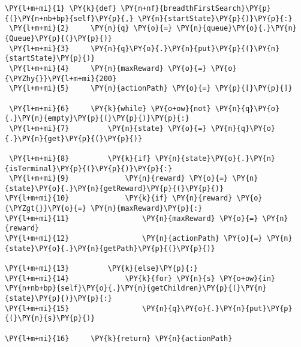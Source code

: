 \begin{Verbatim}[commandchars=\\\{\}]
 \PY{l+m+mi}{1} \PY{k}{def} \PY{n+nf}{breadthFirstSearch}\PY{p}{(}\PY{n+nb+bp}{self}\PY{p}{,} \PY{n}{startState}\PY{p}{)}\PY{p}{:}
 \PY{l+m+mi}{2}     \PY{n}{q} \PY{o}{=} \PY{n}{queue}\PY{o}{.}\PY{n}{Queue}\PY{p}{(}\PY{p}{)}
 \PY{l+m+mi}{3}     \PY{n}{q}\PY{o}{.}\PY{n}{put}\PY{p}{(}\PY{n}{startState}\PY{p}{)}
 \PY{l+m+mi}{4}     \PY{n}{maxReward} \PY{o}{=} \PY{o}{\PYZhy{}}\PY{l+m+mi}{200}
 \PY{l+m+mi}{5}     \PY{n}{actionPath} \PY{o}{=} \PY{p}{[}\PY{p}{]}

 \PY{l+m+mi}{6}     \PY{k}{while} \PY{o+ow}{not} \PY{n}{q}\PY{o}{.}\PY{n}{empty}\PY{p}{(}\PY{p}{)}\PY{p}{:}
 \PY{l+m+mi}{7}         \PY{n}{state} \PY{o}{=} \PY{n}{q}\PY{o}{.}\PY{n}{get}\PY{p}{(}\PY{p}{)}

 \PY{l+m+mi}{8}         \PY{k}{if} \PY{n}{state}\PY{o}{.}\PY{n}{isTerminal}\PY{p}{(}\PY{p}{)}\PY{p}{:}
 \PY{l+m+mi}{9}             \PY{n}{reward} \PY{o}{=} \PY{n}{state}\PY{o}{.}\PY{n}{getReward}\PY{p}{(}\PY{p}{)}
\PY{l+m+mi}{10}             \PY{k}{if} \PY{n}{reward} \PY{o}{\PYZgt{}}\PY{o}{=} \PY{n}{maxReward}\PY{p}{:}
\PY{l+m+mi}{11}                 \PY{n}{maxReward} \PY{o}{=} \PY{n}{reward}
\PY{l+m+mi}{12}                 \PY{n}{actionPath} \PY{o}{=} \PY{n}{state}\PY{o}{.}\PY{n}{getPath}\PY{p}{(}\PY{p}{)}

\PY{l+m+mi}{13}         \PY{k}{else}\PY{p}{:}
\PY{l+m+mi}{14}             \PY{k}{for} \PY{n}{s} \PY{o+ow}{in} \PY{n+nb+bp}{self}\PY{o}{.}\PY{n}{getChildren}\PY{p}{(}\PY{n}{state}\PY{p}{)}\PY{p}{:}
\PY{l+m+mi}{15}                 \PY{n}{q}\PY{o}{.}\PY{n}{put}\PY{p}{(}\PY{n}{s}\PY{p}{)}

\PY{l+m+mi}{16}     \PY{k}{return} \PY{n}{actionPath}
\end{Verbatim}
